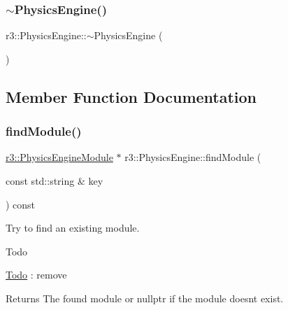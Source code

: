 \mbox{\label{classr3_1_1_physics_engine_a37558d625c57485a92a8fc46697fd11c}} 
\subsubsection{\texorpdfstring{$\sim$\+Physics\+Engine()}{~PhysicsEngine()}}
{\footnotesize\ttfamily r3\+::\+Physics\+Engine\+::$\sim$\+Physics\+Engine (\begin{DoxyParamCaption}{ }\end{DoxyParamCaption})\hspace{0.3cm}{\ttfamily [default]}}



\subsection{Member Function Documentation}
\mbox{\label{classr3_1_1_physics_engine_a60779849b362a1b1b43ef2898c90a3ac}} 
\subsubsection{\texorpdfstring{find\+Module()}{findModule()}}
{\footnotesize\ttfamily \mbox{\hyperlink{classr3_1_1_physics_engine_module}{r3\+::\+Physics\+Engine\+Module}} $\ast$ r3\+::\+Physics\+Engine\+::find\+Module (\begin{DoxyParamCaption}\item[{const std\+::string \&}]{key }\end{DoxyParamCaption}) const}



Try to find an existing module. 

\begin{DoxyRefDesc}{Todo}
\item[\mbox{\hyperlink{todo__todo000004}{Todo}}]\+: remove \end{DoxyRefDesc}
\begin{DoxyReturn}{Returns}
The found module or nullptr if the module doesn\textquotesingle{}t exist. 
\end{DoxyReturn}
\mbox{\label{classr3_1_1_physics_engine_ad24c27b1288eb3b4d18be70a5e257e4b}} 
